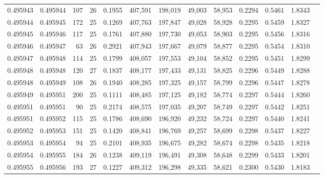 \begin{tabular}{rrrrrrrrrrrrr}
0.495943 & 0.495944 & 107 &  26 &                                     0.1955 & 407,591 & 198,019 &  49,003 &  58,953 & 0.2294 & 0.5461 & 1.8343 \\
0.495944 & 0.495945 & 172 &  25 &                                     0.1269 & 407,763 & 197,847 &  49,028 &  58,928 & 0.2295 & 0.5459 & 1.8327 \\
0.495945 & 0.495946 & 117 &  25 &                                     0.1761 & 407,880 & 197,730 &  49,053 &  58,903 & 0.2295 & 0.5456 & 1.8316 \\
0.495946 & 0.495947 &  63 &  26 &                                     0.2921 & 407,943 & 197,667 &  49,079 &  58,877 & 0.2295 & 0.5454 & 1.8310 \\
0.495947 & 0.495948 & 114 &  25 &                                     0.1799 & 408,057 & 197,553 &  49,104 &  58,852 & 0.2295 & 0.5451 & 1.8299 \\
0.495948 & 0.495948 & 120 &  27 &                                     0.1837 & 408,177 & 197,433 &  49,131 &  58,825 & 0.2296 & 0.5449 & 1.8288 \\
0.495948 & 0.495949 & 108 &  26 &                                     0.1940 & 408,285 & 197,325 &  49,157 &  58,799 & 0.2296 & 0.5447 & 1.8278 \\
0.495949 & 0.495951 & 200 &  25 &                                     0.1111 & 408,485 & 197,125 &  49,182 &  58,774 & 0.2297 & 0.5444 & 1.8260 \\
0.495951 & 0.495951 &  90 &  25 &                                     0.2174 & 408,575 & 197,035 &  49,207 &  58,749 & 0.2297 & 0.5442 & 1.8251 \\
0.495951 & 0.495952 & 115 &  25 &                                     0.1786 & 408,690 & 196,920 &  49,232 &  58,724 & 0.2297 & 0.5440 & 1.8241 \\
0.495952 & 0.495953 & 151 &  25 &                                     0.1420 & 408,841 & 196,769 &  49,257 &  58,699 & 0.2298 & 0.5437 & 1.8227 \\
0.495953 & 0.495954 &  94 &  25 &                                     0.2101 & 408,935 & 196,675 &  49,282 &  58,674 & 0.2298 & 0.5435 & 1.8218 \\
0.495954 & 0.495955 & 184 &  26 &                                     0.1238 & 409,119 & 196,491 &  49,308 &  58,648 & 0.2299 & 0.5433 & 1.8201 \\
0.495955 & 0.495956 & 193 &  27 &                                     0.1227 & 409,312 & 196,298 &  49,335 &  58,621 & 0.2300 & 0.5430 & 1.8183 \\

\end{tabular}
